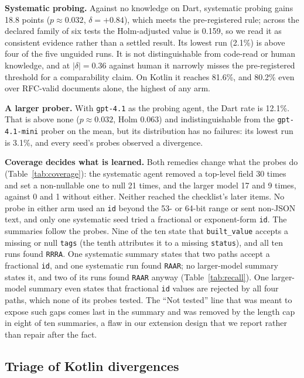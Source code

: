 \textbf{Systematic probing.} Against no knowledge on Dart, systematic
probing gains 18.8 points ($p \approx 0.032$, $\delta = +0.84$), which
meets the pre-registered rule; across the declared family of six tests the
Holm-adjusted value is 0.159, so we read it as consistent evidence rather
than a settled result. Its lowest run (2.1\%) is above four of the five
unguided runs. It is not distinguishable from code-read or human knowledge,
and at $|\delta| = 0.36$ against human it narrowly misses the
pre-registered threshold for a comparability claim. On Kotlin it reaches
81.6\%, and 80.2\% even over RFC-valid documents alone, the highest of any
arm.

\textbf{A larger prober.} With \texttt{gpt-4.1} as the probing agent, the
Dart rate is 12.1\%. That is above none ($p \approx 0.032$, Holm 0.063)
and indistinguishable from the \texttt{gpt-4.1-mini} prober on the mean,
but its distribution has no failures: its lowest run is 3.1\%, and every
seed's probes observed a divergence.

\textbf{Coverage decides what is learned.} Both remedies change what the
probes do (Table~\ref{tab:coverage}): the systematic agent removed a
top-level field 30 times and set a non-nullable one to null 21 times, and the
larger model 17 and 9 times, against 0 and 1 without either. Neither reached the
checklist's later items. No probe in either arm used an \texttt{id} beyond
the 53- or 64-bit range or sent non-JSON text, and only one systematic seed
tried a fractional or exponent-form \texttt{id}. The summaries follow the probes. Nine of the
ten state that \texttt{built\_value} accepts a missing or null
\texttt{tags} (the tenth attributes it to a missing \texttt{status}), and
all ten runs found \texttt{RRRA}. One systematic summary states that
two paths accept a fractional \texttt{id}, and one systematic run found
\texttt{RAAR}; no larger-model summary states it, and two of its runs found
\texttt{RAAR} anyway (Table~\ref{tab:recall}). One larger-model summary
even states that fractional \texttt{id} values are rejected by all four
paths, which none of its probes tested. The ``Not tested'' line that was
meant to expose such gaps comes last in the summary and was removed by the
length cap in eight of ten summaries, a flaw in our extension design that
we report rather than repair after the fact.

\subsection{Triage of Kotlin divergences}
\label{sec:triage}

